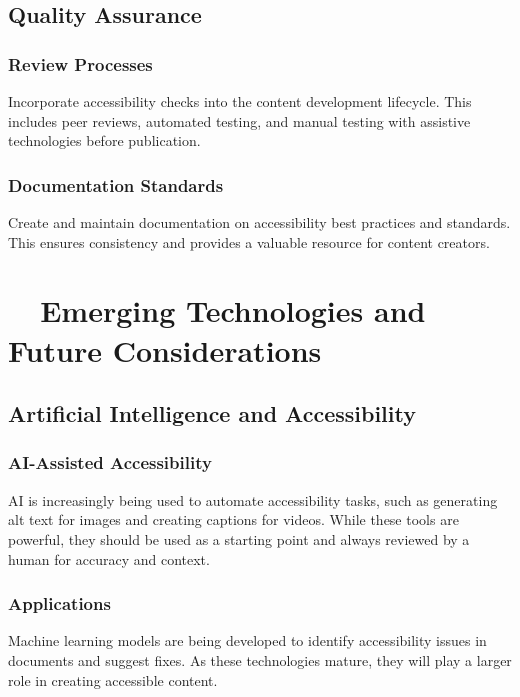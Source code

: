 \subsection{Quality Assurance}\label{ch15:ssec:qa}

\subsubsection{Review Processes}\label{ch15:sssec:review-processes}
Incorporate accessibility checks into the content development lifecycle. This includes peer reviews, automated testing, and manual testing with assistive technologies before publication.

\subsubsection{Documentation Standards}\label{ch15:sssec:doc-standards}
Create and maintain documentation on accessibility best practices and standards. This ensures consistency and provides a valuable resource for content creators.

\section{~~Emerging Technologies and Future Considerations}\label{ch15:sec:emerging-tech}

\subsection{Artificial Intelligence and Accessibility}\label{ch15:ssec:ai-a11y}

\subsubsection{AI-Assisted Accessibility}\label{ch15:sssec:ai-assisted-a11y}
AI is increasingly being used to automate accessibility tasks, such as generating alt text for images and creating captions for videos. While these tools are powerful, they should be used as a starting point and always reviewed by a human for accuracy and context.

\subsubsection{ Applications}\label{ch15:sssec:ml-apps}
Machine learning models are being developed to identify accessibility issues in documents and suggest fixes. As these technologies mature, they will play a larger role in creating accessible content.

